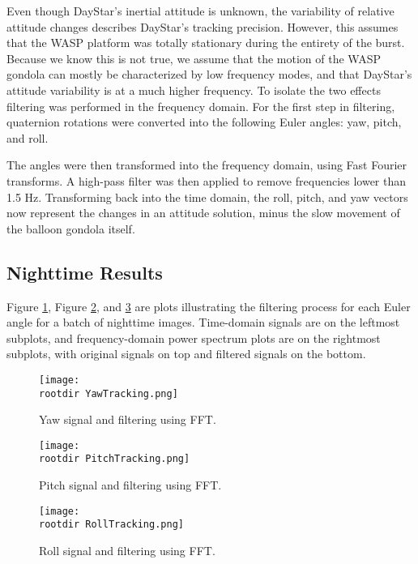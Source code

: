 \documentclass[twocolumn,letterpaper]{IEEEAerospace2012}
\newcommand{\rootdir}{./Figures/}
\begin{document}
Even though DayStar's inertial attitude is unknown, the variability of relative attitude changes describes DayStar's tracking precision. However, this assumes that the WASP platform was totally stationary during the entirety of the burst. Because we know this is not true, we assume that the motion of the WASP gondola can mostly be characterized by low frequency modes, and that DayStar's attitude variability is at a much higher frequency. To isolate the two effects filtering was performed in the frequency domain. For the first step in filtering, quaternion rotations were converted into the following Euler angles: yaw, pitch, and roll.

The angles were then transformed into the frequency domain, using Fast Fourier transforms. A high-pass filter was then applied to remove frequencies lower than 1.5 Hz. Transforming back into the time domain, the roll, pitch, and yaw vectors now represent the changes in an attitude solution, minus the slow movement of the balloon gondola itself.


\subsection{Nighttime Results}

Figure \ref{fig:Yaw Filtering}, Figure \ref{fig:Pitch Filtering}, and \ref{fig:Roll Filtering} are plots illustrating the filtering process for each Euler angle for a batch of nighttime images. Time-domain signals are on the leftmost subplots, and frequency-domain power spectrum plots are on the rightmost subplots, with original signals on top and filtered signals on the bottom.
\begin{figure}[H]
    \centering	
    \texttt{[image: \\rootdir YawTracking.png]}
    \caption{Yaw signal and filtering using FFT.}
    \label{fig:Yaw Filtering}
\end{figure}

\begin{figure}[H]
    \centering
    \texttt{[image: \\rootdir PitchTracking.png]}
    \caption{Pitch signal and filtering using FFT.}
    \label{fig:Pitch Filtering}
\end{figure}

\begin{figure}[H]
    \centering
    \texttt{[image: \\rootdir RollTracking.png]}
    \caption{Roll signal and filtering using FFT.}
    \label{fig:Roll Filtering}
\end{figure}
\end{document}
